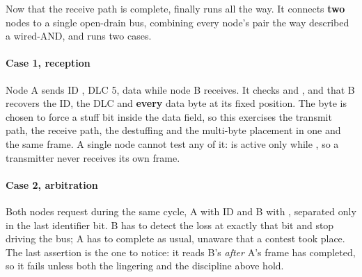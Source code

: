 Now that the receive path is complete,  finally runs all the
way. It connects \textbf{two}  nodes to a single open-drain bus, combining every
node's pair  the way  described a wired-AND, and runs two
cases.

\paragraph{Case 1, reception}
Node A sends ID , DLC 5, data  while node B receives. It checks
 and , and that B recovers the ID, the DLC and \textbf{every} data byte
at its fixed position. The byte  is chosen to force a stuff bit inside the data field, so
this exercises the transmit path, the receive path, the destuffing and the multi-byte placement in one
and the same frame. A single node cannot test any of it:  is active only while
, so a transmitter never receives its own frame.

\paragraph{Case 2, arbitration}
Both nodes request during the same cycle, A with ID  and B with , separated
only in the last identifier bit. B has to detect the loss at exactly that bit and stop driving the
bus; A has to complete as usual, unaware that a contest took place. The last assertion is the one to
notice: it reads B's  \emph{after} A's frame has completed, so it fails unless both the
lingering  and the  discipline above hold.
